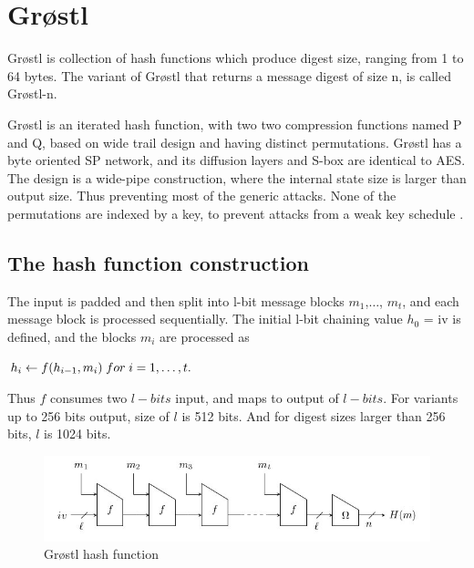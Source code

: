 
\section{Gr{\o}stl}

Gr{\o}stl is collection of hash functions which produce digest size, ranging from 1 to 64 bytes. The variant of
Gr{\o}stl that returns a message digest of size n, is called Gr{\o}stl-n.

Gr{\o}stl is an iterated hash function, with two two compression functions named P and Q, based on wide trail design
and having distinct permutations. Gr{\o}stl has a byte oriented SP network, and its diffusion layers and S-box 
are identical to AES. The design is a wide-pipe construction, where the internal state size is larger than output 
size. Thus preventing most of the generic attacks. None of the permutations are indexed by a key, to prevent attacks
from a weak key schedule \cite{00019}.

  \subsection{The hash function construction}

  The input is padded and then split into l-bit message blocks $m_{1}$,$\ldots$, $m_{t}$, and each message block is
  processed sequentially. The initial l-bit chaining value $h_{0}$ = iv is defined, and the blocks $m_{i}$ are
  processed as 

  \begin{center}$ h_{i}\gets f(h_{i-1}, m_{i})\thickspace for \thickspace i = 1,\ldots, t.$\end{center}

  Thus $f$ consumes two $l-bits$ input, and maps to output of $l-bits$. For variants up to 256 bits output, size of $l$ is
  512 bits. And for digest sizes larger than 256 bits, $l$ is 1024 bits.

  \begin{figure}
    \begin{center}
      \includegraphics[width=5.5in]{groestlhashfunction.jpg}
    \end{center}
    \caption{Gr{\o}stl hash function \cite{00019}}
    \label{fig:lab}
  \end{figure}

